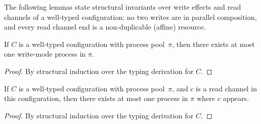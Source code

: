 The following lemmas state structural
invariants over write effects and read channels of a well-typed
configuration: no two writes are in parallel composition, and every read channel end is a non-duplicable (affine) resource.

\begin{lemma}
\label{lem:UniqueWriter}
If $C$ is a well-typed configuration with process pool~$\pi$, 
then there exists at most one write-mode process in $\pi$.
\begin{proof}
By structural induction over the typing derivation for $C$.
\end{proof}
\end{lemma}

\begin{lemma}
\label{lem:UniqueReader}
If $C$ is a well-typed configuration with process pool~$\pi$, 
and $c$ is a read channel in this configuration,
then there exists at most one process in $\pi$ where $c$ appears.
\begin{proof}
By structural induction over the typing derivation for $C$.
\end{proof}
\end{lemma}


